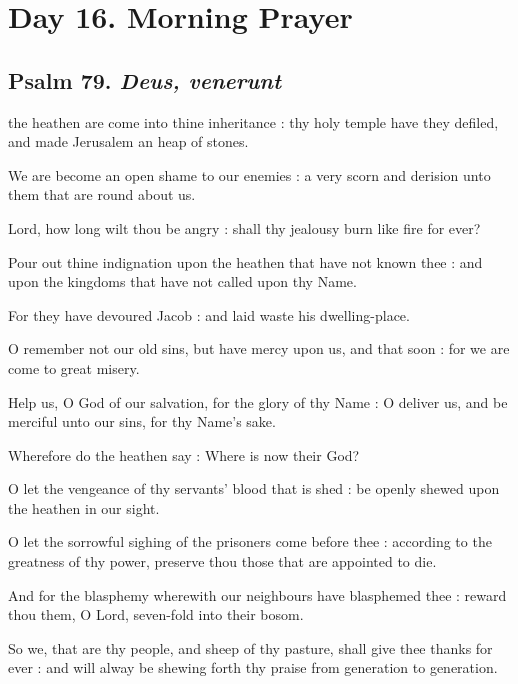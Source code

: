 \clearpage
\section*{Day 16. Morning Prayer}

\subsection{Psalm 79. \textit{Deus, venerunt}}

 the heathen are come into thine inheritance : thy holy temple have they defiled, and made Jerusalem an heap of stones.\par
{}
We are become an open shame to our enemies : a very scorn and derision unto them that are round about us.\par
{}Lord, how long wilt thou be angry : shall thy jealousy burn like fire for ever?\par
{}Pour out thine indignation upon the heathen that have not known thee : and upon the kingdoms that have not called upon thy Name.\par
{}For they have devoured Jacob : and laid waste his dwelling-place.\par
{}O remember not our old sins, but have mercy upon us, and that soon : for we are come to great misery.\par
{}Help us, O God of our salvation, for the glory of thy Name : O deliver us, and be merciful unto our sins, for thy Name's sake.\par
{}Wherefore do the heathen say : Where is now their God?\par
{}O let the vengeance of thy servants' blood that is shed : be openly shewed upon the heathen in our sight.\par
{}O let the sorrowful sighing of the prisoners come before thee : according to the greatness of thy power, preserve thou those that are appointed to die.\par
{}And for the blasphemy wherewith our neighbours have blasphemed thee : reward thou them, O Lord, seven-fold into their bosom.\par
{}So we, that are thy people, and sheep of thy pasture, shall give thee thanks for ever : and will alway be shewing forth thy praise from generation to generation.\par

